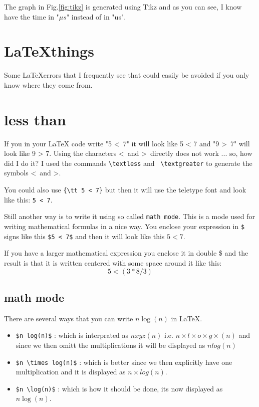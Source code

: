 \documentclass[a4paper,11pt]{article}
\begin{document}
The graph in Fig.\ref{fig:tikz} is generated using Tikz and as you can
see, I know have the time in "$\mu s$" instead of in "us".


\section*{\LaTeX things}

Some \LaTeX errors that I frequently see that could easily be avoided
if you only know where they come from.

\section*{less than}

If you in your LaTeX code write "5 \textless\ 7" it will look like 5 <
7 and "9 \textgreater\ 7" will look like 9 > 7. Using the characters
\textless\ and \textgreater\ directly does not work ... so, how did I
do it?  I used the commands {\tt  \textbackslash textless} and {\tt
  \textbackslash textgreater} to generate the symbols \textless\ and
\textgreater.

You could also use {\tt \{\textbackslash tt 5 < 7\}} but then it
will use the teletype font and look like this: {\tt 5 < 7}.

Still another way is to write it using so called {\tt math mode}. This
is a mode used for writing mathematical formulas in a nice way. You
enclose your expression in {\tt \$} signs like this {\tt \$5 < 7\$}
and then it will look like this $5 < 7$.

If you have a larger mathematical expression you enclose it in double
\$ and the result is that it is written centered with some space
around it like this:  $$ 5 < (3 * 8 / 3 ) $$

\subsection{math mode}

There are several ways that you can write $n \log(n)$ in \LaTeX.

\begin{itemize}
\item {\tt \$n log(n)\$}  : which is interprated as $n xyz(n)$ i.e. $n \times l \times o \times g \times (n)$ and since we then omitt the multiplications it will be displayed as $n log(n)$

\item {\tt \$n \textbackslash times log(n)\$} : which is better since
  we then explicitly have one multiplication and it is displayed as
  $n \times log(n)$.

\item {\tt \$n \textbackslash log(n)\$} : which is how it should be
  done, its now displayed as $n \log(n)$.
\end{itemize}  
\end{document}
